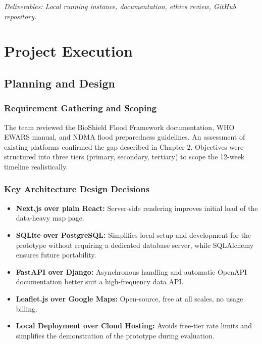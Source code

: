 \documentclass[12pt,a4paper]{report}
\begin{document}
\textit{Deliverables: Local running instance, documentation, ethics review, GitHub repository.}

\chapter{Project Execution}

\section{Planning and Design}

\subsection{Requirement Gathering and Scoping}

The team reviewed the BioShield Flood Framework documentation, WHO EWARS manual, and NDMA flood preparedness guidelines. An assessment of existing platforms confirmed the gap described in Chapter 2. Objectives were structured into three tiers (primary, secondary, tertiary) to scope the 12-week timeline realistically.

\subsection{Key Architecture Design Decisions}

\begin{itemize}[noitemsep]
  \item \textbf{Next.js over plain React:} Server-side rendering improves initial load of the data-heavy map page.
  \item \textbf{SQLite over PostgreSQL:} Simplifies local setup and development for the prototype without requiring a dedicated database server, while SQLAlchemy ensures future portability.
  \item \textbf{FastAPI over Django:} Asynchronous handling and automatic OpenAPI documentation better suit a high-frequency data API.
  \item \textbf{Leaflet.js over Google Maps:} Open-source, free at all scales, no usage billing.
  \item \textbf{Local Deployment over Cloud Hosting:} Avoids free-tier rate limits and simplifies the demonstration of the prototype during evaluation.
\end{itemize}
\end{document}
